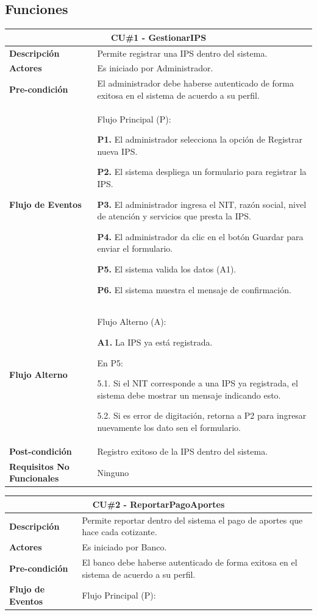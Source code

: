 \documentclass[12pt,a4paper]{article}
\begin{document}
\subsection{Funciones}
\begin{center}
\begin{tabular}{|p{5.5cm}| p{9.5cm}|}
\hline 
\multicolumn{2}{|c|}{\textbf{CU\#1 - GestionarIPS}} \\ 
\hline 
\textbf{Descripción} & Permite registrar una IPS dentro del sistema. \\ 
\hline 
\textbf{Actores} & Es iniciado por Administrador. \\ 
\hline 
\textbf{Pre-condición} & El administrador debe haberse autenticado de forma exitosa en el sistema de acuerdo a su perfil. \\ 
\hline 
\textbf{Flujo de Eventos} & Flujo Principal (P):

\textbf{P1.} El administrador selecciona la opción de Registrar nueva IPS.

\textbf{P2.} El sistema despliega un formulario para registrar la IPS.

\textbf{P3.} El administrador ingresa el NIT, razón social, nivel de atención y servicios que presta la IPS.

\textbf{P4.} El administrador da clic en el botón Guardar para enviar el formulario.

\textbf{P5.} El sistema valida los datos (A1).

\textbf{P6.} El sistema muestra el mensaje de confirmación.
\\
\hline 
\textbf{Flujo Alterno} &  Flujo Alterno (A):

\textbf{A1.} La IPS ya está registrada.

	En P5:
	
	5.1. Si el NIT corresponde a una IPS ya registrada, el sistema debe mostrar un mensaje indicando esto.
	
	5.2. Si es error de digitación, retorna a P2 para ingresar nuevamente los dato sen el formulario. \\ 
\hline 
\textbf{Post-condición}  & Registro exitoso de la IPS dentro del sistema. \\ 
\hline 
\textbf{Requisitos No Funcionales} & Ninguno \\ 
\hline 
\end{tabular}
\vspace{5mm}

\begin{tabular}{|p{5.5cm}| p{9.5cm}|}
\hline 
\multicolumn{2}{|c|}{\textbf{CU\#2 - ReportarPagoAportes}} \\ 
\hline 
\textbf{Descripción} & Permite reportar dentro del sistema el pago de aportes que hace cada cotizante. \\ 
\hline 
\textbf{Actores} & Es iniciado por Banco. \\ 
\hline 
\textbf{Pre-condición} & El banco debe haberse autenticado de forma exitosa en el sistema de acuerdo a su perfil. \\ 
\hline 
\textbf{Flujo de Eventos} & Flujo Principal (P):


\end{tabular}
\end{center}
\end{document}

